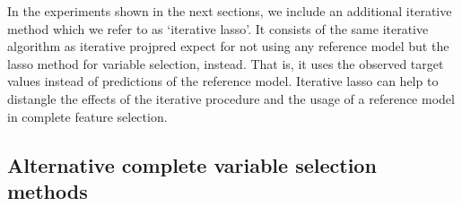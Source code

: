 \documentclass[a4]{article}
\theoremstyle{definition}
\newcommand{\note}[1]{\textcolor{red}{#1}}
\begin{document}
In the experiments shown in the next sections, we include an additional iterative
method which we refer to as `iterative lasso'. It consists of the same iterative
algorithm as iterative projpred expect for not using any reference model but
the lasso method for variable selection, instead.
That is, it uses the observed target values instead of predictions of the reference model.
Iterative lasso can help to distangle the effects
of the iterative procedure and the usage of a reference model in complete feature selection.

\subsection{Alternative complete variable selection methods}


\end{document}
